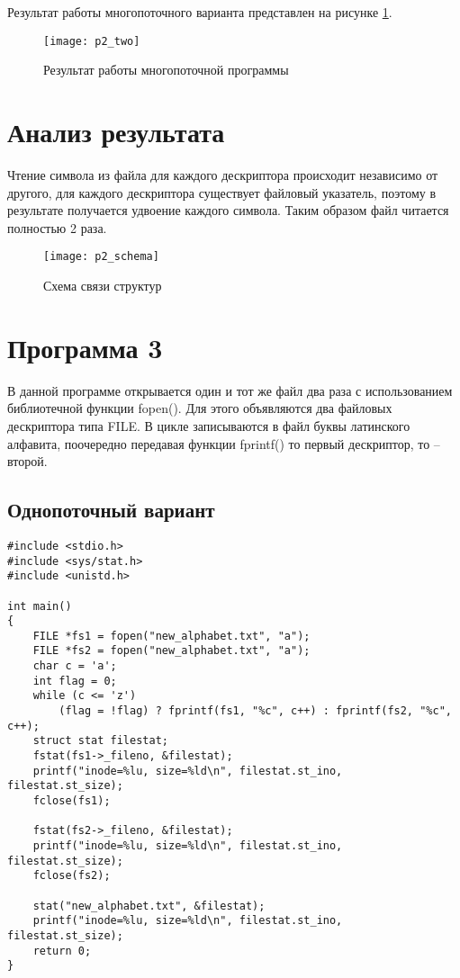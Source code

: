 Результат работы многопоточного варианта представлен на рисунке \ref{p2_two}.

\begin{figure}[ht!]
	\centering
	\texttt{[image: p2\_two]}
	\caption{Результат работы многопоточной программы}
	\label{p2_two}
\end{figure}

\section*{Анализ результата}

Чтение символа из файла для каждого дескриптора происходит независимо от другого, для каждого дескриптора существует файловый указатель, поэтому в результате получается удвоение каждого символа. Таким образом файл читается полностью 2 раза.

\begin{figure}[ht!]
	\centering
	\texttt{[image: p2\_schema]}
	\caption{Схема связи структур}
\end{figure}


\section*{Программа 3}

В данной программе открывается один и тот же файл два раза с использованием библиотечной функции fopen(). Для этого объявляются два файловых дескриптора типа FILE. В цикле записываются в файл буквы латинского алфавита, поочередно передавая функции fprintf() то первый дескриптор, то – второй.

\pagebreak

\subsection*{Однопоточный вариант}

\begin{lstlisting}[caption=Однопоточный вариант]
#include <stdio.h>
#include <sys/stat.h>
#include <unistd.h>

int main()
{
	FILE *fs1 = fopen("new_alphabet.txt", "a");
	FILE *fs2 = fopen("new_alphabet.txt", "a");
	char c = 'a';
	int flag = 0;
	while (c <= 'z')
		(flag = !flag) ? fprintf(fs1, "%c", c++) : fprintf(fs2, "%c", c++);
	struct stat filestat;
	fstat(fs1->_fileno, &filestat);
	printf("inode=%lu, size=%ld\n", filestat.st_ino, filestat.st_size);
	fclose(fs1);
	
	fstat(fs2->_fileno, &filestat);
	printf("inode=%lu, size=%ld\n", filestat.st_ino, filestat.st_size);
	fclose(fs2);
	
	stat("new_alphabet.txt", &filestat);
	printf("inode=%lu, size=%ld\n", filestat.st_ino, filestat.st_size);
	return 0;
}
\end{lstlisting}

